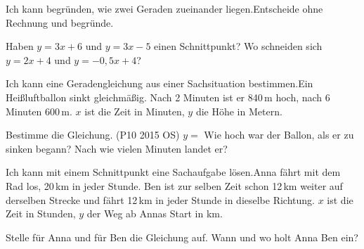 \begin{aufgabe}{Ich kann begründen, wie zwei Geraden zueinander liegen.\newline Entscheide ohne Rechnung und begründe.}
\begin{teile}
\teil Haben $y = 3x + 6$ und $y = 3x - 5$ einen Schnittpunkt?
\teil Wo schneiden sich $y = 2x + 4$ und $y = -0{,}5x + 4$?
\end{teile}
\end{aufgabe}

\begin{aufgabe}{Ich kann eine Geradengleichung aus einer Sachsituation bestimmen.\newline Ein Heißluftballon sinkt gleichmäßig. Nach 2 Minuten ist er 840\,m hoch, nach 6 Minuten 600\,m. $x$ ist die Zeit in Minuten, $y$ die Höhe in Metern.}
\begin{teile}
\teil Bestimme die Gleichung. (P10 2015 OS) \quad $y = $ \leerfeld
\teil Wie hoch war der Ballon, als er zu sinken begann? \quad \leerfeld[m]
\teil Nach wie vielen Minuten landet er? \quad \leerfeld[min]
\end{teile}
\end{aufgabe}

\begin{aufgabe}{Ich kann mit einem Schnittpunkt eine Sachaufgabe lösen.\newline Anna fährt mit dem Rad los, 20\,km in jeder Stunde. Ben ist zur selben Zeit schon 12\,km weiter auf derselben Strecke und fährt 12\,km in jeder Stunde in dieselbe Richtung. $x$ ist die Zeit in Stunden, $y$ der Weg ab Annas Start in km.}
\begin{teile}
\teil Stelle für Anna und für Ben die Gleichung auf.
\teil Wann und wo holt Anna Ben ein?
\end{teile}
\end{aufgabe}
